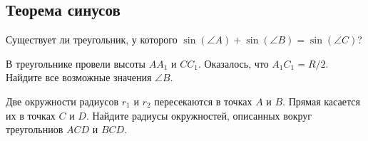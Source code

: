 \subsection*{Теорема синусов}

\begin{problems}

\item
Существует ли треугольник, у которого
$\sin(\angle A) + \sin(\angle B) = \sin(\angle C)$?

\item
В треугольнике провели высоты $A A_1$ и $C C_1$.
Оказалось, что $A_1 C_1 = R / 2$.
Найдите все возможные значения $\angle B$.

\item
Две окружности радиусов $r_1$ и $r_2$ пересекаются в точках $A$ и $B$.
Прямая касается их в точках $C$ и $D$.
Найдите радиусы окружностей, описанных вокруг треугольниов $ACD$ и $BCD$.

\end{problems}

